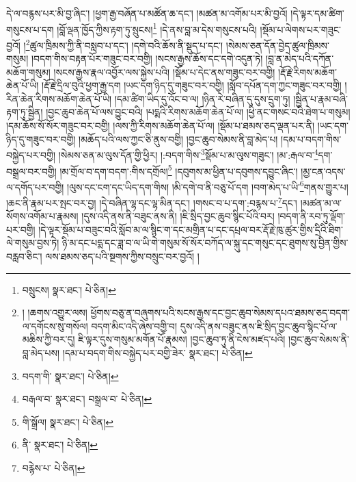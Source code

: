 དེ་ལ་བརྙས་པར་མི་བྱ་ཞིང་། །ཕྱག་རྒྱ་བཞོན་པ་མཚོན་ཆ་དང་། །མཚན་མ་འགོམ་པར་མི་བྱའོ། །དེ་ལྟར་དམ་ཚིག་གསུངས་པ་དག །བློ་ལྡན་ཁྱོད་ཀྱིས་རྟག་ཏུ་སྲུངས།\footnote{བསྲུངས།  སྣར་ཐང་།  པེ་ཅིན། } །དེ་ནས་བླ་མ་དེས་གསུངས་པའི། །སྡོམ་པ་ལེགས་པར་གཟུང་བྱའོ། །\footnote{། །ཆགས་འགྱུར་ལས། ཕྱོགས་བཅུ་ན་བཞུགས་པའི་སངས་རྒྱས་དང་བྱང་ཆུབ་སེམས་དཔའ་ཐམས་ཅད་བདག་ལ་དགོངས་སུ་གསོལ། བདག་མིང་འདི་ཞེས་བགྱི་བ། དུས་འདི་ནས་བཟུང་ནས་ཇི་སྲིད་བྱང་ཆུབ་སྙིང་པོ་ལ་མཆིས་ཀྱི་བར་དུ། ཇི་ལྟར་དུས་གསུམ་མགོན་པོ་རྣམས། །བྱང་ཆུབ་ཏུ་ནི་ངེས་མཛད་པའི། །བྱང་ཆུབ་སེམས་ནི་བླ་མེད་པས། །དམ་པ་བདག་གིས་བསྐྱེད་པར་བགྱི་ཟེར་  སྣར་ཐང་།  པེ་ཅིན། }ཚུལ་ཁྲིམས་ཀྱི་ནི་བསླབ་པ་དང་། །དགེ་བའི་ཆོས་ནི་སྡུད་པ་དང་། །སེམས་ཅན་དོན་བྱེད་ཚུལ་ཁྲིམས་གསུམ། །བདག་གིས་བརྟན་པོར་གཟུང་བར་བགྱི། །སངས་རྒྱས་ཆོས་དང་དགེ་འདུན་ཏེ། །བླ་ན་མེད་པའི་དཀོན་མཆོག་གསུམ། །སངས་རྒྱས་རྣལ་འབྱོར་ལས་སྐྱེས་པའི། །སྡོམ་པ་དེང་ནས་གཟུང་བར་བགྱི། །རྡོ་རྗེ་རིགས་མཆོག་ཆེན་པོ་ཡི། །རྡོ་རྗེ་དྲིལ་བུའི་ཕྱག་རྒྱ་དག །ཡང་དག་ཉིད་དུ་གཟུང་བར་བགྱི། །སློབ་དཔོན་དག་ཀྱང་གཟུང་བར་བགྱི། །རིན་ཆེན་རིགས་མཆོག་ཆེན་པོ་ཡི། །དམ་ཚིག་ཡིད་དུ་འོང་བ་ལ། །ཉིན་རེ་བཞིན་དུ་དུས་དྲུག་ཏུ། །སྦྱིན་པ་རྣམ་བཞི་རྟག་ཏུ་སྦྱིན། །བྱང་ཆུབ་ཆེན་པོ་ལས་བྱུང་བའི། །པདྨའི་རིགས་མཆོག་ཆེན་པོ་ལ། །ཕྱི་ནང་གསང་བའི་ཐེག་པ་གསུམ། །དམ་ཆོས་སོ་སོར་གཟུང་བར་བགྱི། །ལས་ཀྱི་རིགས་མཆོག་ཆེན་པོ་ལ། །སྡོམ་པ་ཐམས་ཅད་ལྡན་པར་ནི། །ཡང་དག་ཉིད་དུ་གཟུང་བར་བགྱི། །མཆོད་པའི་ལས་ཀྱང་ཅི་ནུས་བགྱི། །བྱང་ཆུབ་སེམས་ནི་བླ་མེད་པ། །དམ་པ་བདག་གིས་བསྐྱེད་པར་བགྱི། །སེམས་ཅན་མ་ལུས་དོན་གྱི་ཕྱིར། །:བདག་གིས་\footnote{བདག་གི་  སྣར་ཐང་།  པེ་ཅིན། }སྡོམ་པ་མ་ལུས་གཟུང་། །མ་:རྒལ་བ་\footnote{བརྒལ་བ་  སྣར་ཐང་། བསྒྲལ་བ་  པེ་ཅིན། }དག་བསྒྲལ་བར་བགྱི། །མ་གྲོལ་བ་དག་བདག་:གིས་དགྲོལ།\footnote{གི་སྒྲོལ།  སྣར་ཐང་།  པེ་ཅིན། } །དབུགས་མ་ཕྱིན་པ་དབུགས་དབྱུང་ཞིང་། །མྱ་ངན་འདས་ལ་དགོད་པར་བགྱི། །ལུས་དང་ངག་དང་ཡིད་དག་གིས། །མི་དགེ་བ་ནི་བཅུ་པོ་དག །བག་མེད་པ་ཡི་\footnote{ནི་  སྣར་ཐང་།  པེ་ཅིན། }གནས་གྱུར་པ། །ཆང་ནི་རྣམ་པར་སྤང་བར་བྱ། །དེ་བཞིན་ལྷ་དང་ལྷ་མིན་དང་། །གསང་བ་པ་དག་:བརྙས་པ་\footnote{བརྙེས་པ་  པེ་ཅིན། }དང་། །མཚན་མ་ལ་སོགས་འགོམ་པ་རྣམས། །དུས་འདི་ནས་ནི་བཟུང་ནས་ནི། །ཇི་སྲིད་བྱང་ཆུབ་སྙིང་པོའི་བར། །བདག་ནི་རབ་ཏུ་ལྡོག་པར་བགྱི། །དེ་ལྟར་སྡོམ་པ་བཟུང་བའི་སློབ་མ་ལ་སྙིང་ག་དང་མགྲིན་པ་དང་དཔྲལ་བར་རྡོ་རྗེ་ཁུ་ཚུར་གྱིས་དྲིའི་ཐིག་ལེ་གསུམ་བྱས་ཏེ། ཉི་མ་དང་པདྨ་དང་ཟླ་བ་ལ་ཡི་གེ་གསུམ་སོ་སོར་བཀོད་ལ་སྐུ་དང་གསུང་དང་ཐུགས་སུ་བྱིན་གྱིས་བརླབ་ཅིང་། ལས་ཐམས་ཅད་པའི་སྔགས་ཀྱིས་བསྲུང་བར་བྱའོ། །
